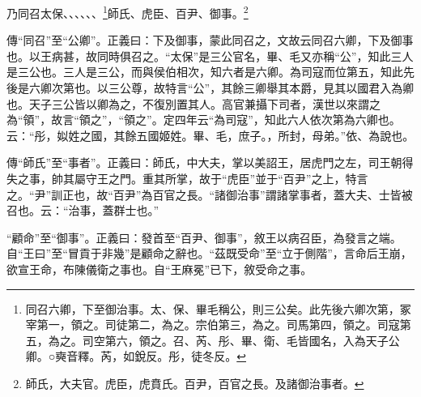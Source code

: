 乃同召太保、、、、、、\footnote{同召六卿，下至御治事。太、保、畢毛稱公，則三公矣。此先後六卿次第，冢宰第一，領之。司徒第二，為之。宗伯第三，為之。司馬第四，領之。司寇第五，為之。司空第六，領之。召、芮、彤、畢、衛、毛皆國名，入為天子公卿。○奭音釋。芮，如銳反。彤，徒冬反。}師氏、虎臣、百尹、御事。\footnote{師氏，大夫官。虎臣，虎賁氏。百尹，百官之長。及諸御治事者。}

{\noindent\zhuan{}\fzbyks 傳“同召”至“公卿”。正義曰：下及御事，蒙此同召之，文故云同召六卿，下及御事也。以王病甚，故同時俱召之。“太保”是三公官名，畢、毛又亦稱“公”，知此三人是三公也。三人是三公，而與侯伯相次，知六者是六卿。為司寇而位第五，知此先後是六卿次第也。以三公尊，故特言“公”，其餘三卿舉其本爵，見其以國君入為卿也。天子三公皆以卿為之，不復別置其人。高官兼攝下司者，漢世以來謂之為“領”，故言“領之”，“領之”。定四年云“為司寇”，知此六人依次第為六卿也。云：“彤，姒姓之國，其餘五國姬姓。畢、毛，庶子。，所封，母弟。”依、為說也。 \par}

{\noindent\zhuan{}\fzbyks 傳“師氏”至“事者”。正義曰：師氏，中大夫，掌以美詔王，居虎門之左，司王朝得失之事，帥其屬守王之門。重其所掌，故于“虎臣”並于“百尹”之上，特言之。“尹”訓正也，故“百尹”為百官之長。“諸御治事”謂諸掌事者，蓋大夫、士皆被召也。云：“治事，蓋群士也。” \par}

{\noindent\shu{}\fzkt “顧命”至“御事”。正義曰：發首至“百尹、御事”，敘王以病召臣，為發言之端。自“王曰”至“冒貢于非幾”是顧命之辭也。“茲既受命”至“立于側階”，言命后王崩，欲宣王命，布陳儀衛之事也。自“王麻冕”已下，敘受命之事。 \par}

